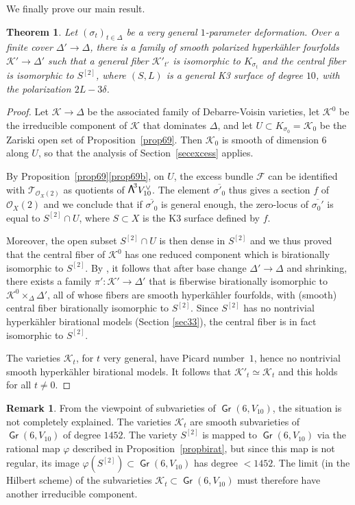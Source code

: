 \documentclass[JEP,XML,SOM,Unicode, NoEqCountersInSection,NoFloatCountersInSection]{cedram}
\let\mathcal\mathscr
\newtheorem{theo}[lemm]{Theorem}
\theoremstyle{definition}
\newtheorem{rema}[lemm]{Remark}
\newcommand\cF{\mathcal{F}}
\newcommand\cK{\mathcal{K}}
\newcommand\cO{\mathcal{O}}\let\OO\cO
\newcommand\cT{\mathcal{T}}
\DeclareMathOperator{\Gr}{\mathsf{Gr}}
\let\phi\varphi
\let\cong\simeq
\newcommand\bw[1]{{\hbox{\large$\mathsf{\Lambda}$}^{\!#1}}}
\newcommand\hilbS{S^{[2]}}
\newcommand\hk{hyperkähler\xspace}
\begin{document}
We finally prove our main result.

\begin{theo} \label{theopourgenre6}
Let $(\sigma_t)_{t\in \Delta}$ be a very general $1$-parameter deformation.
Over a finite cover $\Delta'\!\to\!\Delta$, there is a family of smooth polarized \hk fourfolds
\hbox{$\cK'\!\to\!\Delta'$} such that a general fiber
$\cK'_{t'}$ is isomorphic to $K_{\sigma_t}$ and the central fiber
is isomorphic to
$\hilbS$, where $(S,L)$ is a general K3 surface of degree $10$, with the polarization $2L-3\delta$.
\end{theo}

\begin{proof} Let $ \cK\to \Delta$ be the associated family of Debarre-Voisin varieties, let $\cK^0$ be the irreducible component of $\cK$ that dominates $\Delta$, and let $U\subset K_{\sigma_0}=\cK_0$ be the Zariski open set of Proposition~\ref{prop69}. Then $ \cK_0$ is smooth of dimension $6$ along $U$, so that the analysis of Section~\ref{secexcess}
applies.

By Proposition~\ref{prop69}\eqref{prop69b}, on $U$, the excess bundle
$\cF$ can be identified with $\cT_{\cO_X(2)}$ as quotients of $\bw3V_{10}^\vee$. The element $\overline{\sigma'_0}$
thus gives a section
$f$ of $ \cO_X(2)$ and we conclude that if $\overline {\sigma'_0}$ is general enough, the zero-locus of $\overline {\sigma_0'}$
is equal to $\hilbS\cap U$, where
$S\subset X$ is the K3 surface defined by $f$.

Moreover, the open subset $\hilbS\cap U$ is then dense in $\hilbS$
and we thus proved that the central fiber of $\cK^0$ has one reduced component which is birationally isomorphic to $\hilbS$.
By \cite{KLSV}, it follows that after base change $\Delta'\to \Delta$ and shrinking, there exists a family
$\pi'\colon\cK'\to \Delta'$ that is fiberwise birationally isomorphic to $\cK^0\times_\Delta\Delta'$, all of whose fibers
are smooth \hk fourfolds, with (smooth) central fiber birationally isomorphic to $\hilbS$. Since $\hilbS$ has no nontrivial \hk birational models (Section \ref{sec33}), the central fiber is in fact isomorphic to $\hilbS$.

The varieties $\cK_t$, for $t$ very general, have Picard number~$1$, hence no nontrivial smooth \hk birational models. It follows that $\cK'_t\cong \cK_t$ and this holds for all $t\ne 0$.
\end{proof}

\begin{rema}
From the viewpoint of subvarieties of $\Gr(6,V_{10})$, the situation is not completely explained. The varieties
$\cK_t$ are smooth subvarieties of $\Gr(6,V_{10})$ of degree $1452$. The variety $\hilbS$ is mapped to $\Gr(6,V_{10})$ via
the rational map $\phi$ described in Proposition~\ref{propbirat}, but since this map
is not regular, its image $\phi(\hilbS)\subset \Gr(6,V_{10})$ has degree $<1452$. The limit (in the Hilbert scheme) of the subvarieties
$\cK_t\subset \Gr(6,V_{10})$ must therefore have another irreducible component.
\end{rema}
\end{document}
